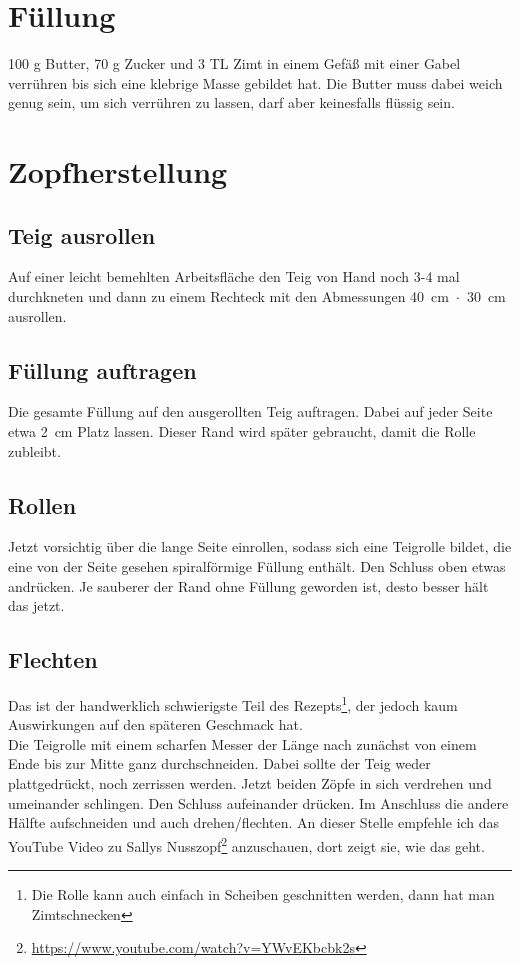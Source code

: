 \documentclass[a4paper, oneside]{recipe}
\begin{document}
\section*{Füllung}
100 g Butter, 70 g Zucker und 3 TL Zimt in einem Gefäß mit einer Gabel verrühren bis sich eine klebrige Masse gebildet hat. Die Butter muss dabei weich genug sein, um sich verrühren zu lassen, darf aber keinesfalls flüssig sein.

\section*{Zopfherstellung}
\subsection*{Teig ausrollen}
Auf einer leicht bemehlten Arbeitsfläche den Teig von Hand noch 3-4 mal durchkneten und dann zu einem Rechteck mit den Abmessungen 40~cm~$\cdot$~30~cm ausrollen.

\subsection*{Füllung auftragen}
Die gesamte Füllung auf den ausgerollten Teig auftragen. Dabei auf jeder Seite etwa 2~cm Platz lassen. Dieser Rand wird später gebraucht, damit die Rolle zubleibt.

\subsection*{Rollen}
Jetzt vorsichtig über die lange Seite einrollen, sodass sich eine Teigrolle bildet, die eine von der Seite gesehen spiralförmige Füllung enthält. Den Schluss oben etwas andrücken. Je sauberer der Rand ohne Füllung geworden ist, desto besser hält das jetzt.

\subsection*{Flechten}
Das ist der handwerklich schwierigste Teil des Rezepts\footnote{Die Rolle kann auch einfach in Scheiben geschnitten werden, dann hat man Zimtschnecken}, der jedoch kaum Auswirkungen auf den späteren Geschmack hat. \\
Die Teigrolle mit einem scharfen Messer der Länge nach zunächst von einem Ende bis zur Mitte ganz durchschneiden. Dabei sollte der Teig weder plattgedrückt, noch zerrissen werden. Jetzt beiden Zöpfe in sich verdrehen und umeinander schlingen. Den Schluss aufeinander drücken. Im Anschluss die andere Hälfte aufschneiden und auch drehen/flechten. An dieser Stelle empfehle ich das YouTube Video zu Sallys Nusszopf\footnote{\url{https://www.youtube.com/watch?v=YWvEKbcbk2s}} anzuschauen, dort zeigt sie, wie das geht.
\end{document}
